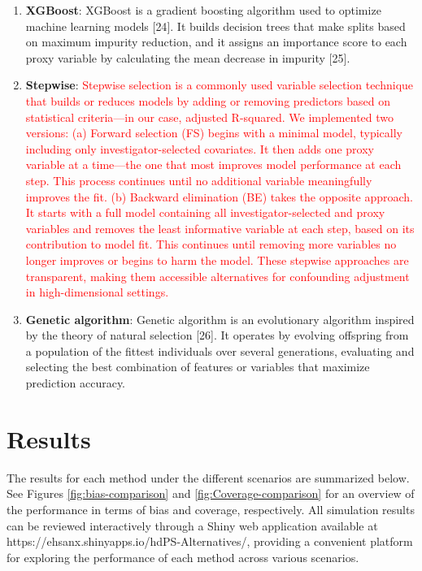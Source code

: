 \documentclass[10pt,letterpaper]{article}
\begin{document}
\begin{enumerate}
  variable based on the decrease in impurity or Gini importance,
  providing a ranking of the proxies. The top 100 variables from this
  ranking are manually selected for further modeling {[}8{]}.
\item
  \textbf{XGBoost}: XGBoost is a gradient boosting algorithm used to
  optimize machine learning models {[}24{]}. It builds decision trees
  that make splits based on maximum impurity reduction, and it assigns
  an importance score to each proxy variable by calculating the mean
  decrease in impurity {[}25{]}.
\item
  \textbf{Stepwise}:
  \textcolor{red}{Stepwise selection is a commonly used variable selection technique that builds or reduces models by adding or removing predictors based on statistical criteria—in our case, adjusted R-squared. We implemented two versions: (a) Forward selection (FS) begins with a minimal model, typically including only investigator-selected covariates. It then adds one proxy variable at a time—the one that most improves model performance at each step. This process continues until no additional variable meaningfully improves the fit. (b) Backward elimination (BE) takes the opposite approach. It starts with a full model containing all investigator-selected and proxy variables and removes the least informative variable at each step, based on its contribution to model fit. This continues until removing more variables no longer improves or begins to harm the model. These stepwise approaches are transparent, making them accessible alternatives for confounding adjustment in high-dimensional settings.}
\item
  \textbf{Genetic algorithm}: Genetic algorithm is an evolutionary
  algorithm inspired by the theory of natural selection {[}26{]}. It
  operates by evolving offspring from a population of the fittest
  individuals over several generations, evaluating and selecting the
  best combination of features or variables that maximize prediction
  accuracy.
\end{enumerate}

\section{Results}\label{results}

The results for each method under the different scenarios are summarized
below. See Figures \ref{fig:bias-comparison} and
\ref{fig:Coverage-comparison} for an overview of the performance in
terms of bias and coverage, respectively. All simulation results can be
reviewed interactively through a Shiny web application available at
https://ehsanx.shinyapps.io/hdPS-Alternatives/, providing a convenient
platform for exploring the performance of each method across various
scenarios.
\end{document}
